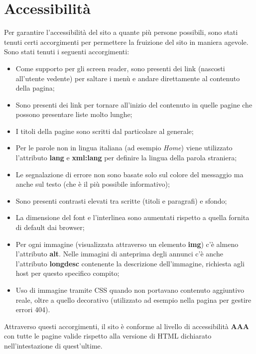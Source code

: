 \documentclass[1_relazione.tex]{subfiles}
\begin{document}
    \section{Accessibilit\`{a}}
    Per garantire l'accessibilità del sito a quante più persone possibili, sono stati tenuti certi accorgimenti per permettere la fruizione del sito in maniera agevole.
    Sono stati tenuti i seguenti accorgimenti:
    \begin{itemize}
        \item Come supporto per gli screen reader, sono presenti dei link (nascosti all'utente vedente) per saltare i men\`{u} e andare direttamente al contenuto della pagina;

        \item Sono presenti dei link per tornare all'inizio del contenuto in quelle pagine che possono presentare liste molto lunghe;

        \item I titoli della pagine sono scritti dal particolare al generale;

        \item Per le parole non in lingua italiana (ad esempio \textit{Home}) viene utilizzato l'attributo \textbf{lang} e \textbf{xml:lang} per definire la lingua della parola straniera;

        \item Le segnalazione di errore non sono basate solo sul colore del messaggio ma anche sul testo (che è il più possibile informativo);

        \item Sono presenti contrasti elevati tra scritte (titoli e paragrafi) e sfondo;

        \item La dimensione del font e l'interlinea sono aumentati rispetto a quella fornita di default dai browser;

        \item Per ogni immagine (visualizzata attraverso un elemento \textbf{img}) c'è almeno l'attributo \textbf{alt}.
        Nelle immagini di anteprima degli annunci c'è anche l'attributo \textbf{longdesc} contenente la descrizione dell'immagine, richiesta agli host per questo specifico compito;

        \item Uso di immagine tramite CSS quando non portavano contenuto aggiuntivo reale, oltre a quello decorativo (utilizzato ad esempio nella pagina per gestire errori 404).

    \end{itemize}
    Attraverso questi accorgimenti, il sito \`{e} conforme al livello di accessibilit\`{a} \textbf{AAA} con tutte le pagine valide rispetto alla versione di HTML dichiarato nell'intestazione di quest'ultime.
\end{document}
